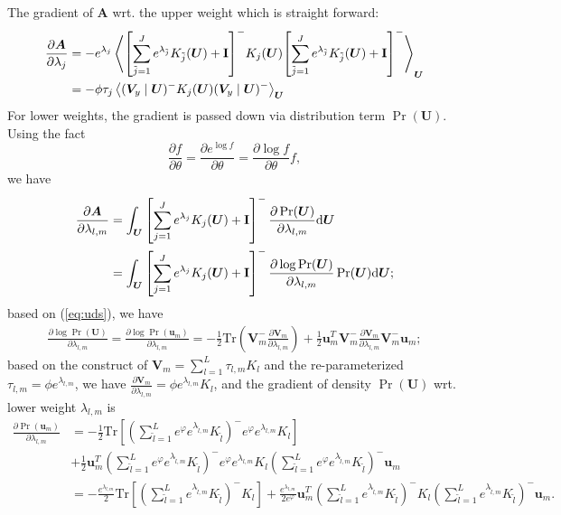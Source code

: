 \documentclass[11pt]{article}
\newcommand{\mean}[2]{\left\langle{#1}\right\rangle_{#2}}
\newcommand{\trb}[1]{\textrm{Tr}\left({#1}\right)}
\newcommand{\trs}[1]{\textrm{Tr}\left[{#1}\right]}
\newcommand{\invb}[1]{{\left({#1}\right)^-}}
\newcommand{\invs}[1]{{\left[{#1}\right]^-}}
\newcommand{\vu}{\boldsymbol{u}}
\newcommand{\xv}{\boldsymbol{V}}
\newcommand{\xu}{\boldsymbol{U}}
\newcommand{\xa}{\boldsymbol{A}}
\newcommand{\id}{\textrm{\textbf{I}}}
\newcommand{\PDV}[2]{\frac{\partial #1}{\partial #2}}
\begin{document}
The gradient of $\xa$ wrt. the upper weight which is straight forward:
\begin{equation}\label{eq:upr_dvt}
  \begin{split}
    \PDV{\xa}{\lambda_j}
    &= -e^{\lambda_j}
    \mean{
      \invs{ \sum_{\tilde{j}=1}^J e^{\lambda_{\tilde{j}}}K_{\tilde{j}}(\xu) + \id }
      K_j(\xu)
      \invs{ \sum_{\tilde{j}=1}^J e^{\lambda_{\tilde{j}}}K_{\tilde{j}}(\xu) + \id }
    }{\xu} \\
    &= -\phi\tau_j\mean{ (\xv_y\mid\xu)^- K_j(\xu) (\xv_y\mid\xu)^- }{\xu}
  \end{split}
\end{equation}
For lower weights, the gradient is passed down via distribution term $\Pr(\xu)$. Using the fact
$$ \PDV{f}{\theta}=\PDV{e^{\log{f}}}{\theta} = \PDV{\log{f}}{\theta} f, $$
we have
\begin{align*}
  \PDV{\xa}{\lambda_{l,m}}
  &= \int_{\xu} \left[ \sum_{j=1}^J{e^{\lambda_j} K_j(\xu)} + \id \right]^- \PDV{\Pr(\xu)}{\lambda_{l,m}} \textrm{d}\xu \\
  &= \int_{\xu} \left[ \sum_{j=1}^J{e^{\lambda_j} K_j(\xu)} + \id \right]^- \PDV{\log\Pr(\xu)}{\lambda_{l,m}} \Pr(\xu) \textrm{d}\xu;
\end{align*}
based on (\ref{eq:uds}), we have
\begin{align*}
  \PDV{\log\Pr(\xu)}{\lambda_{l,m}}
  = \PDV{\log\Pr(\vu_m)}{\lambda_{l,m}} 
  = -\frac{1}{2}\trb{\xv_m^- \PDV{\xv_m}{\lambda_{l,m}}} + \frac{1}{2}\vu_m^T\xv_m^- \PDV{\xv_m}{\lambda_{l,m}} \xv_m^-\vu_m;
\end{align*}
based on the construct of $\xv_m = \sum_{l=1}^L \tau_{l,m}K_l$ and the re-parameterized $\tau_{l,m} = \phi e^{\lambda_{l,m}}$, we have $\PDV{\xv_m}{\lambda_{l,m}} = \phi e^{\lambda_{l,m}} K_l$, and the gradient of density $\Pr(\xu)$ wrt. lower weight $\lambda_{l,m}$ is
\begin{equation*}\label{eq:uds_dvt}
  \begin{split}
    \PDV{\Pr(\vu_m)}{\lambda_{l,m}} 
    &= -\frac{1}{2}
    \trs
    {
      \invb{\sum_{\tilde{l}=1}^L e^{\varphi}e^{\lambda_{\tilde{l},m}} K_{\tilde{l}}}
      e^{\varphi} e^{\lambda_{l,m}} K_l
    } \\
    &+ \frac{1}{2} \vu_m^T 
    \invb{ \sum_{\tilde{l}=1}^L e^{\varphi}e^{\lambda_{\tilde{l},m}} K_{\tilde{l}}} 
    e^{\varphi} e^{\lambda_{l,m}} K_l
    \invb{ \sum_{\tilde{l}=1}^L e^{\varphi}e^{\lambda_{\tilde{l},m}} K_{\tilde{l}}}
    \vu_m \\
    &= -\frac{e^{\lambda_{l,m}}}{2} 
    \trs{ \left(\sum_{\tilde{l}=1}^L e^{\lambda_{\tilde{l},m}} K_{\tilde{l}}\right)^- K_l }
    + \frac{e^{\lambda_{l,m}}}{2 e^{\varphi}}
    \vu_m^T
    \invb{\sum_{\tilde{l}=1}^L e^{\lambda_{\tilde{l},m}} K_{\tilde{l}}}
    K_l
    \invb{\sum_{\tilde{l}=1}^L e^{\lambda_{\tilde{l},m}} K_{\tilde{l}}}
    \vu_m .
  \end{split}
\end{equation*}
\end{document}

